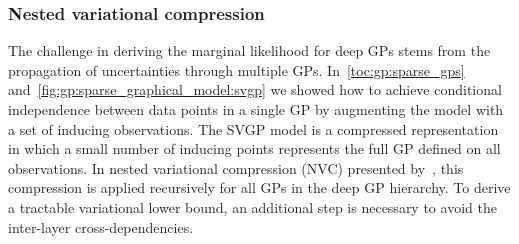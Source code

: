 \subsubsection{Nested variational compression}
The challenge in deriving the marginal likelihood for deep GPs stems from the propagation of uncertainties through multiple GPs.
In~\cref{toc:gp:sparse_gps} and~\cref{fig:gp:sparse_graphical_model:svgp} we showed how to achieve conditional independence between data points in a single GP by augmenting the model with a set of inducing observations.
The SVGP model is a compressed representation in which a small number of inducing points represents the full GP defined on all observations.
In nested variational compression (NVC) presented by~\textcite{hensman_nested_2014}, this compression is applied recursively for all GPs in the deep GP hierarchy.
To derive a tractable variational lower bound, an additional step is necessary to avoid the inter-layer cross-dependencies.

